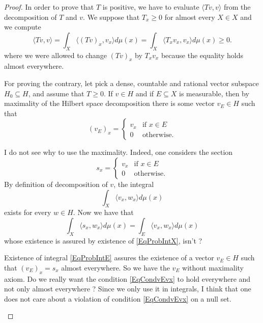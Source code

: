 \begin{proof}
	In order to prove that $T$ is positive, we have to evaluate $\langle Tv, v\rangle $ from the decomposition of $T$ and $v$. We suppose that $T_x\geq 0$ for almost every $X\in X$ and we compute
	\begin{equation}
		\langle Tv, v\rangle =\int_X\langle (Tv)_x, v_x\rangle d\mu(x)=\int_X\langle T_xv_x, v_x\rangle d\mu(x)\geq 0.
	\end{equation}
	where we were allowed to change $(Tv)_x$ by $T_xv_x$ because the equality holds almost everywhere.

	For proving the contrary, let pick a dense, countable and rational vector subspace $H_0\subseteq H$, and assume that $T\geq 0$. If $v\in H$ and if $E\subseteq X$ is measurable, then by maximality of the Hilbert space decomposition there is some vector $v_E\in H$ such that
	\begin{equation}		\label{EqCondvEvx}
		(v_E)_x=
	\begin{cases}
		v_x&\text{if }x\in E\\
		0&\text{otherwise.}
	\end{cases}
	\end{equation}

	\begin{probleme}		\label{ProbMaximvE}
	I do not see why to use the maximality. Indeed, one considers the section 
	\begin{equation}		
		s_x=
	\begin{cases}
		v_x&\text{if }x\in E\\
		0&\text{otherwise.}
	\end{cases}
	\end{equation}
	By definition of decomposition of $v$, the integral
	\begin{equation}		\label{EqProbIntX}
		\int_X\langle v_x, w_x\rangle d\mu(x)
	\end{equation}
	exists for every $w\in H$. Now we have that
	\begin{equation}		\label{EqProbIntE}
		\int_X\langle s_x, w_x\rangle d\mu(x)= \int_E\langle v_x, w_x\rangle d\mu(x)
	\end{equation}
	whose existence is assured by existence of \eqref{EqProbIntX}, isn't ? 

	Existence of integral \eqref{EqProbIntE} assures the existence of a vector $v_E\in H$ such that $(v_E)_x=s_x$ almost everywhere. So we have the $v_E$ without maximality axiom. Do we really want the condition \eqref{EqCondvEvx} to hold everywhere and not only almost everywhere ? Since we only use it in integrals, I think that one does not care about a violation of condition \eqref{EqCondvEvx} on a null set.
	\end{probleme}


\end{proof}
